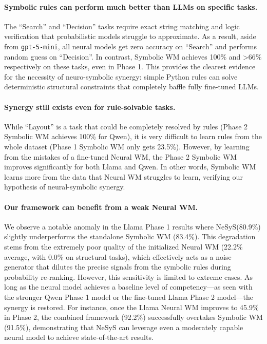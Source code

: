 \documentclass{article}
\theoremstyle{plain}
\theoremstyle{definition}
\theoremstyle{remark}
\newcommand{\ours}{{\sc NeSyS}\xspace}
\begin{document}
\paragraph{Symbolic rules can perform much better than LLMs on specific tasks.} The ``Search'' and ``Decision'' tasks require exact string matching and logic verification that probabilistic models struggle to approximate. As a result, aside from \texttt{gpt-5-mini}, all neural models get zero accuracy on ``Search'' and performs random guess on ``Decision''. In contrast, Symbolic WM achieves 100\% and >66\% respectively on these tasks, even in Phase 1. This provides the clearest evidence for the necessity of neuro-symbolic synergy: simple Python rules can solve deterministic structural constraints that completely baffle fully fine-tuned LLMs.

\paragraph{Synergy still exists even for rule-solvable tasks.} While ``Layout'' is a task that could be completely resolved by rules (Phase 2 Symbolic WM achieves 100\% for Qwen), it is very difficult to learn rules from the whole dataset (Phase 1 Symbolic WM only gets 23.5\%). However, by learning from the mistakes of a fine-tuned Neural WM, the Phase 2 Symbolic WM improves significantly for both Llama and Qwen. In other words, Symbolic WM learns more from the data that Neural WM struggles to learn, verifying our hypothesis of neural-symbolic synergy.

\paragraph{Our framework can benefit from a weak Neural WM.} We observe a notable anomaly in the Llama Phase 1 results where \ours (80.9\%) slightly underperforms the standalone Symbolic WM (83.4\%). This degradation stems from the extremely poor quality of the initialized Neural WM (22.2\% average, with 0.0\% on structural tasks), which effectively acts as a noise generator that dilutes the precise signals from the symbolic rules during probability re-ranking. However, this sensitivity is limited to extreme cases. As long as the neural model achieves a baseline level of competency—as seen with the stronger Qwen Phase 1 model or the fine-tuned Llama Phase 2 model—the synergy is restored. For instance, once the Llama Neural WM improves to 45.9\% in Phase 2, the combined framework (92.2\%) successfully overtakes Symbolic WM (91.5\%), demonstrating that \ours can leverage even a moderately capable neural model to achieve state-of-the-art results.
\end{document}
